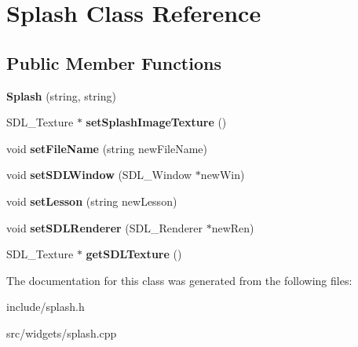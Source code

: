 \hypertarget{classSplash}{}\section{Splash Class Reference}
\label{classSplash}
\subsection*{Public Member Functions}
\begin{DoxyCompactItemize}
\item 
\mbox{\label{classSplash_a71bbc334353f16ce40bdfca52d32eb94}} 
{\bfseries Splash} (string, string)
\item 
\mbox{\label{classSplash_a6b2649886e94ea28e1b910da627123ce}} 
S\+D\+L\+\_\+\+Texture $\ast$ {\bfseries set\+Splash\+Image\+Texture} ()
\item 
\mbox{\label{classSplash_ae8de772dab4c6c484dc67d29e0df7d1f}} 
void {\bfseries set\+File\+Name} (string new\+File\+Name)
\item 
\mbox{\label{classSplash_a833fde6c73fc45af7e878d8bf475ea6c}} 
void {\bfseries set\+S\+D\+L\+Window} (S\+D\+L\+\_\+\+Window $\ast$new\+Win)
\item 
\mbox{\label{classSplash_a9b33cdc0a70533b291735a11bfb36143}} 
void {\bfseries set\+Lesson} (string new\+Lesson)
\item 
\mbox{\label{classSplash_a674ca69ed1500b9b3642a20ac18af3d4}} 
void {\bfseries set\+S\+D\+L\+Renderer} (S\+D\+L\+\_\+\+Renderer $\ast$new\+Ren)
\item 
\mbox{\label{classSplash_a44dd5594567694247ad66df24ab3a499}} 
S\+D\+L\+\_\+\+Texture $\ast$ {\bfseries get\+S\+D\+L\+Texture} ()
\end{DoxyCompactItemize}


The documentation for this class was generated from the following files\+:\begin{DoxyCompactItemize}
\item 
include/splash.\+h\item 
src/widgets/splash.\+cpp\end{DoxyCompactItemize}
